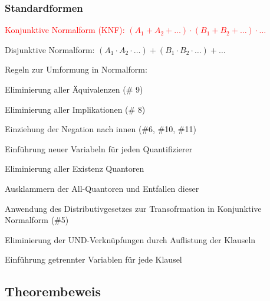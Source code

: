\documentclass[german,color,6pt]{latex4ei/latex4ei_sheet}
\begin{document}
\begin{sectionbox}
\subsubsection{Standardformen}
\textcolor{red}{Konjunktive Normalform (KNF): $(A_1 + A_2 + \dots) \cdot (B_1 + B_2 + \dots) \cdot \dots$ }

Disjunktive Normalform: $(A_1 \cdot A_2 \cdot \dots) + (B_1 \cdot B_2 \cdot \dots) + \dots$

\begin{cookbox}{Regeln zur Umformung in Normalform:}
	\item Eliminierung aller Äquivalenzen (\# 9)
	\item Eliminierung aller Implikationen (\# 8)
	\item Einziehung der Negation nach innen (\#6, \#10, \#11)
	\item Einführung neuer Variabeln für jeden Quantifizierer
	\item Eliminierung aller Existenz Quantoren
	\item Ausklammern der All-Quantoren und Entfallen dieser
	\item Anwendung des Distributivgesetzes zur Transofrmation in Konjunktive Normalform (\#5)
	\item Eliminierung der UND-Verknüpfungen durch Auflistung der Klauseln
	\item Einführung getrennter Variablen für jede Klausel
\end{cookbox}
\end{sectionbox}

\subsection{Theorembeweis}
\end{document}
